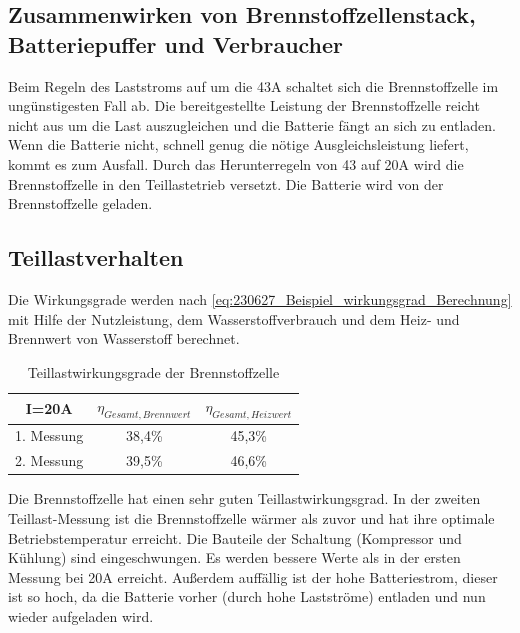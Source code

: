 \subsection{Zusammenwirken von Brennstoffzellenstack, Batteriepuffer und Verbraucher}
Beim Regeln des Laststroms auf um die 43A schaltet sich die Brennstoffzelle im ungünstigesten Fall ab.
Die bereitgestellte Leistung der Brennstoffzelle reicht nicht aus um die Last auszugleichen und die Batterie fängt an sich zu entladen.
Wenn die Batterie nicht, schnell genug die nötige Ausgleichsleistung liefert, kommt es zum Ausfall.
Durch das Herunterregeln von 43 auf 20A wird die Brennstoffzelle in den Teillastetrieb versetzt.
Die Batterie wird von der Brennstoffzelle geladen.






\subsection{Teillastverhalten}

Die Wirkungsgrade werden nach \autoref{eq:230627_Beispiel_wirkungsgrad_Berechnung} mit Hilfe der Nutzleistung, dem Wasserstoffverbrauch und dem Heiz- und Brennwert von Wasserstoff berechnet. 

\begin{table}[H]
    \caption{Teillastwirkungsgrade der Brennstoffzelle}
    \centering
        \begin{tabular}[pos]{|c|c|c|}
            \hline
            \rowcolor[HTML]{70AD47} 
            I=20A   & $\eta_{Gesamt,Brennwert}$               & $\eta_{Gesamt,Heizwert}$   \\\hline\hline
            1. Messung  & 38,4\%                            & 45,3\%                            \\ \hline
            2. Messung  & 39,5\%                            & 46,6\%                            \\\hline
        \end{tabular}
        \label{tab:20230628_Teillastwirkungsgrade}
\end{table}

Die Brennstoffzelle hat einen sehr guten Teillastwirkungsgrad. In der zweiten Teillast-Messung ist die Brennstoffzelle wärmer als zuvor und hat ihre optimale Betriebstemperatur erreicht. Die Bauteile der Schaltung (Kompressor und Kühlung) sind eingeschwungen. Es werden bessere Werte als in der ersten Messung bei 20A erreicht. Außerdem auffällig ist der hohe Batteriestrom, dieser ist so hoch, da die Batterie vorher (durch hohe Lastströme) entladen und nun wieder aufgeladen wird. 

